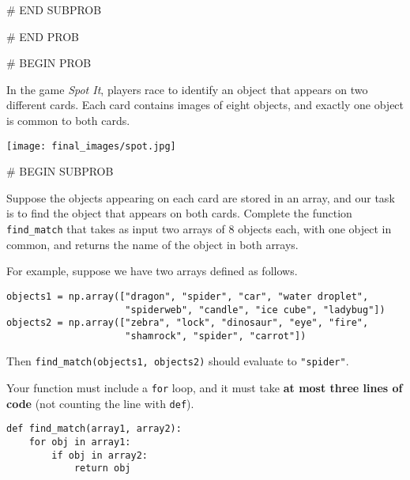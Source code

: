 \documentclass[twoside,12pt]{article}
\begin{document}
{ 
    

# END SUBPROB    






# END PROB

\newpage
# BEGIN PROB



In the game \textit{Spot It}, players race to identify an object that appears on two different cards. Each card contains images of eight objects, and exactly one object is common to both cards. 

\vspace*{-0.2in}

\begin{center}
\texttt{[image: final\_images/spot.jpg]}
\end{center}

\vspace*{-0.4in}


    # BEGIN SUBPROB


    Suppose the objects appearing on each card are stored in an array, and our task is to find the object that appears on both cards. Complete the function \texttt{find\_match} that takes as input two arrays of 8 objects each, with one object in common, and returns the name of the object in both arrays.

    For example, suppose we have two arrays defined as follows.

\begin{verbatim}
objects1 = np.array(["dragon", "spider", "car", "water droplet", 
                     "spiderweb", "candle", "ice cube", "ladybug"]) 
objects2 = np.array(["zebra", "lock", "dinosaur", "eye", "fire",
                     "shamrock", "spider", "carrot"])
\end{verbatim}

    Then \texttt{find\_match(objects1, objects2)} should evaluate to \texttt{"spider"}.

    Your function must include a \texttt{for} loop, and it must take \textbf{at most three lines of code} (not counting the line with \texttt{def}).

\begin{mdframed}
\begin{verbatim}
def find_match(array1, array2):
    for obj in array1:
        if obj in array2:
            return obj
            
\end{verbatim}
\end{mdframed}
     
}
\end{document}
